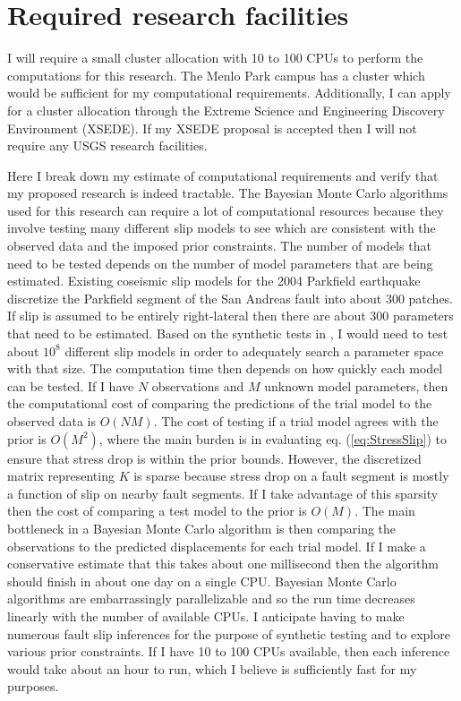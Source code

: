 \documentclass[12pt]{article}
\begin{document}
\section*{Required research facilities}
I will require a small cluster allocation with 10 to 100 CPUs to perform the computations for this research.  The Menlo Park campus has a cluster which would be sufficient for my computational requirements.  Additionally, I can apply for a cluster allocation through the Extreme Science and Engineering Discovery Environment (XSEDE).  If my XSEDE proposal is accepted then I will not require any USGS research facilities.  

Here I break down my estimate of computational requirements and verify that my proposed research is indeed tractable.  The Bayesian Monte Carlo algorithms used for this research can require a lot of computational resources because they involve testing many different slip models to see which are consistent with the observed data and the imposed prior constraints.  The number of models that need to be tested depends on the number of model parameters that are being estimated. Existing coseismic slip models for the 2004 Parkfield earthquake discretize the Parkfield segment of the San Andreas fault into about 300 patches. If slip is assumed to be entirely right-lateral then there are about 300 parameters that need to be estimated.  Based on the synthetic tests in \citet{Minson2013}, I would need to test about $10^{8}$ different slip models in order to adequately search a parameter space with that size.  The computation time then depends on how quickly each model can be tested.  If I have $N$ observations and $M$ unknown model parameters, then the computational cost of comparing the predictions of the trial model to the observed data is $O(NM)$.  The cost of testing if a trial model agrees with the prior is $O(M^2)$, where the main burden is in evaluating eq. (\ref{eq:StressSlip}) to ensure that stress drop is within the prior bounds.  However, the discretized matrix representing $K$ is sparse because stress drop on a fault segment is mostly a function of slip on nearby fault segments.  If I take advantage of this sparsity then the cost of comparing a test model to the prior is $O(M)$.  The main bottleneck in a Bayesian Monte Carlo algorithm is then comparing the observations to the predicted displacements for each trial model.  If I make a conservative estimate that this takes about one millisecond then the algorithm should finish in about one day on a single CPU.  Bayesian Monte Carlo algorithms are embarrassingly parallelizable and so the run time decreases linearly with the number of available CPUs.  I anticipate having to make numerous fault slip inferences for the purpose of synthetic testing and to explore various prior constraints.  If I have 10 to 100 CPUs available, then each inference would take about an hour to run, which I believe is sufficiently fast for my purposes.           
\end{document}
